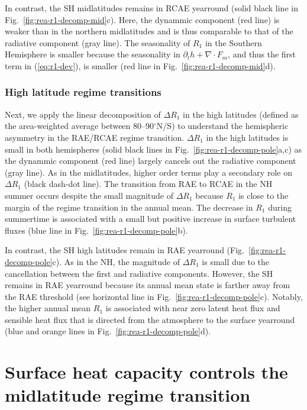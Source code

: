 \documentclass{ametsocV5}
\begin{document}
      In contrast, the SH midlatitudes remains in RCAE yearround (solid black line in Fig.~\ref{fig:rea-r1-decomp-mid}c). Here, the dynammic component (red line) is weaker than in the northern midlatitudes and is thus comparable to that of the radiative component (gray line). The seasonality of $R_1$ in the Southern Hemisphere is smaller because the seasonality in $\partial_t h + \nabla\cdot F_m$, and thus the first term in (\ref{eq:r1-dev}), is smaller (red line in Fig.~\ref{fig:rea-r1-decomp-mid}d).

    \subsubsection{High latitude regime transitions} \label{subsubsec:hl}
      Next, we apply the linear decomposition of $\Delta R_1$ in the high latitudes (defined as the area-weighted average between 80--90$^{\circ}$N/S) to understand the hemispheric asymmetry in the RAE/RCAE regime transition. $\Delta R_1$ in the high latitudes is small in both hemispheres (solid black lines in Fig.~\ref{fig:rea-r1-decomp-pole}a,c) as the dynammic component (red line) largely cancels out the radiative component (gray line). As in the midlatitudes, higher order terms play a secondary role on $\Delta R_1$ (black dash-dot line). The transition from RAE to RCAE in the NH summer occurs despite the small magnitude of $\Delta R_1$ because $R_1$ is close to the margin of the regime transition in the annual mean. The decrease in $R_1$ during summertime is associated with a small but positive increase in surface turbulent fluxes (blue line in Fig.~\ref{fig:rea-r1-decomp-pole}b).     

      In contrast, the SH high latitudes remain in RAE yearround (Fig.~\ref{fig:rea-r1-decomp-pole}c). As in the NH, the magnitude of $\Delta R_1$ is small due to the cancellation between the first and radiative components. However, the SH remains in RAE yearround because its annual mean state is farther away from the RAE threshold (see horizontal line in Fig.~\ref{fig:rea-r1-decomp-pole}c). Notably, the higher annual mean $R_1$ is associated with near zero latent heat flux and sensible heat flux that is directed from the atmosphere to the surface yearround (blue and orange lines in Fig.~\ref{fig:rea-r1-decomp-pole}d).

\section{Surface heat capacity controls the midlatitude regime transition}
\end{document}
